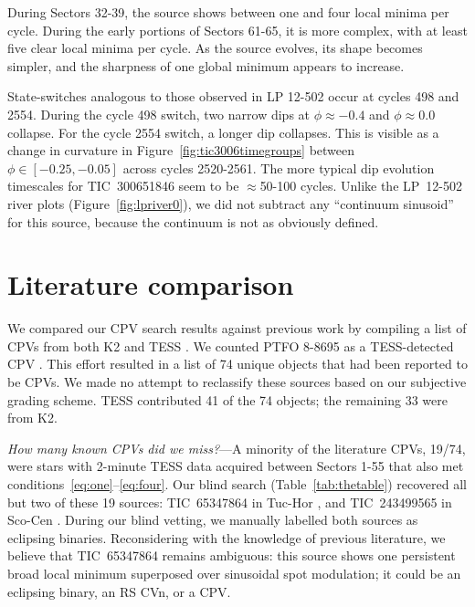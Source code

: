 \documentclass[11pt,twocolumn,tighten,linenumbers]{aastex63}
\begin{document}
During Sectors 32-39, the source shows between one and four local
minima per cycle.  During the early portions of Sectors 61-65, it is
more complex, with at least five clear local minima per
cycle.  As the source evolves, its shape becomes simpler, and the
sharpness of one global minimum appears to increase.

State-switches analogous to those observed in LP 12-502 occur at
cycles 498 and 2554.  During the cycle 498 switch, two narrow dips at
$\phi$$\approx$$-0.4$ and $\phi$$\approx$0.0 collapse.  For the cycle
2554 switch, a longer dip collapses.  This is visible as a change in
curvature in Figure~\ref{fig:tic3006timegroups} between $\phi \in
[-0.25, -0.05]$ across cycles 2520-2561.  The  more typical dip
evolution timescales for TIC~300651846 seem to be $\approx$50-100
cycles.  Unlike the LP~12-502 river plots
(Figure~\ref{fig:lpriver0}), we did not subtract any ``continuum
sinusoid'' for this source, because the continuum is not as obviously
defined.


\section{Literature comparison}
\label{sec:litcomp}

We compared our CPV search results against previous work by
compiling a list of CPVs from both K2
\citep{2017AJ....153..152S,2018AJ....155...63S} and TESS
\citep{2019ApJ...876..127Z,2020AJ....160...86B,2021AJ....161...60S,2022AJ....163..144G,2023ApJ...945..114P}.
We counted PTFO 8-8695 as a TESS-detected CPV \citep[but see][and
references therein]{2020AJ....160...86B}.  This effort resulted in a
list of 74 unique objects that had been reported to be CPVs.  We made
no attempt to reclassify these sources based on our subjective grading
scheme.  TESS contributed 41 of the 74 objects; the remaining 33 were
from K2.  

{\it How many known CPVs did we miss?}---A minority of the literature
CPVs, 19/74, were stars with 2-minute TESS data acquired between
Sectors 1-55 that also met conditions~\ref{eq:one}--\ref{eq:four}.
Our blind search (Table~\ref{tab:thetable}) recovered all but two of
these 19 sources: TIC~65347864 in Tuc-Hor \citep{2023ApJ...945..114P},
and TIC~243499565 in Sco-Cen \citep{2021AJ....161...60S}.  During our
blind vetting, we manually labelled both sources as eclipsing
binaries.  Reconsidering with the knowledge of previous literature, we
believe that TIC~65347864 remains ambiguous: this source shows one
persistent broad local minimum superposed over sinusoidal spot
modulation; it could be an eclipsing binary, an RS CVn, or a CPV.
\end{document}
